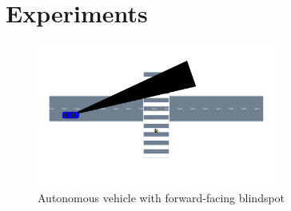 \section{Experiments}

\begin{figure}
    \centering
    \includegraphics[width=0.7\textwidth]{figures/iterative_validation/blindspot.pdf}
    \caption{Autonomous vehicle with forward-facing blindspot}
    \label{fig:ivm_blindspot}
\end{figure}

